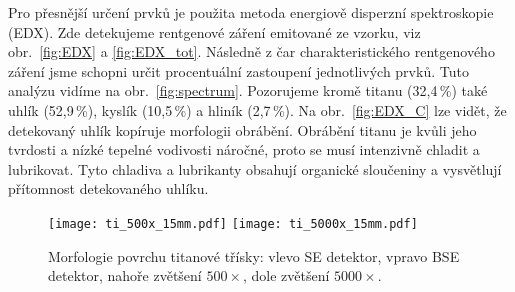 \documentclass[a4paper,12pt]{article}
\begin{document}
Pro přesnější určení prvků je použita metoda energiově disperzní 
spektroskopie (EDX). Zde detekujeme rentgenové záření emitované ze vzorku, viz 
obr.~\ref{fig:EDX} a \ref{fig:EDX_tot}. 
Následně z čar charakteristického rentgenového záření jsme schopni určit 
procentuální zastoupení jednotlivých prvků. Tuto analýzu vidíme na 
obr.~\ref{fig:spectrum}. Pozorujeme kromě titanu (32,4\,\si{\percent}) také 
uhlík (52,9\,\si{\percent}), kyslík (10,5\,\si{\percent}) a hliník 
(2,7\,\si{\percent}). Na obr.~\ref{fig:EDX_C} lze vidět, že detekovaný uhlík 
kopíruje morfologii 
obrábění. Obrábění titanu je kvůli jeho tvrdosti a nízké tepelné vodivosti 
náročné, proto se musí intenzivně chladit a lubrikovat. Tyto chladiva a 
lubrikanty obsahují organické sloučeniny a vysvětlují přítomnost detekovaného 
uhlíku. 


\begin{figure}[h!]
	\centering
	\texttt{[image: ti\_500x\_15mm.pdf]}
	\texttt{[image: ti\_5000x\_15mm.pdf]}
	\caption{\centering Morfologie povrchu titanové třísky: vlevo SE detektor, 
	vpravo BSE 
	detektor, nahoře zvětšení $500\times$, dole zvětšení $5000\times$.}
	\label{fig:ti5000}
\end{figure}


\end{document}
